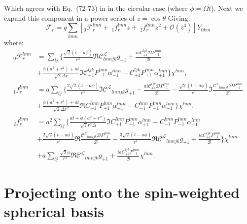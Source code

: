 \documentclass[preprint,showpacs,preprintnumbers,amssymb,superscriptaddress,aps,prd,nofootinbib,11pt]{revtex4-1}
\begin{document}
Which agrees with Eq.~(72-73) in \cite{TorresDolan2022} in the circular case (where $\dot{\phi} = \Omega \dot{t}$). Next we expand this component in a power series of $z=\cos\theta$ Giving:
\begin{equation}
    \mathcal{F}_r = q \sum\limits_{kmn} \left[ {}_0\mathcal{F}_r^{lmn} +\  {}_1f_r^{lmn} z +\  {}_2f_r^{lmn} z^2+ \mathcal{O}(z^3) \right]Y_{0km}
\end{equation}
where:
\begin{align}
   \nonumber {}_0\mathcal{F}_r^{lmn} &= \sum\limits_{lj} \Bigg\{\frac{\sqrt{2} (\dot{t} - a \dot{\phi})}{r^2} \Re{\mathcal{C}^\mathcal{L}_{lmnjk}g_{+1} + \frac{i a \mathcal{C}_{+1}^{ljk} \mathcal{D} P_{-1}^{lmn}}{\mathcal{B}}} \\&+ \frac{\dot{\phi} (a^2 + r^2) + a \dot{t}}{\sqrt{2}\Delta r} \Im{\mathcal{C}_{-1}^{ljk}P_{-1}^{lmn}\alpha_{-1}^{lmn} - \mathcal{C}_{+1}^{ljk} P_{+1}^{lmn} \alpha_{+1}^{lmn}}\Bigg\}\chi^{lmn},\\
   \nonumber {}_1f_r^{lmn} &= a  \sum\limits_{lj} \Bigg\{\frac{2 \sqrt{2} (\dot{t} - a \dot{\phi})}{r^3} \Im{\mathcal{C^L}_{lmnjk} g_{+1} - \frac{ai\mathcal{C}_{+1}^{ljk}\mathcal{D}P_{-1}^{lmn}}{\mathcal{B}}}
   - \frac{\sqrt{2} (\dot{t}-a\dot{\phi})}{r^3} \Im{\frac{\mathcal{C^L}_{lmnjk}\mathcal{D}P_{-1}^{lmn}}{\mathcal{B}}} \\ &+ \frac{\dot{\phi} (a^2 +r^2) + a \dot{t}}{\sqrt{2} \Delta r^2} \Re{C_{+1}^{lmn} P_{+1}^{lmn} \alpha_{+1}^{lmn} - C_{-1}^{lmn} P_{-1}^{lmn} \alpha_{-1}^{lmn}}\Bigg\} \chi^{lmn},\\
   \nonumber {}_2f_r^{lmn} &= a^2 \sum\limits_{lj}\Bigg \{ \frac{a \dot{t} + \dot{\phi} (a^2 + r^2)}{\sqrt{2} r^3 \Delta} \Im{C_{+1}^{lmn} P_{+1}^{lmn} \alpha_{+1}^{lmn} - C_{-1}^{lmn} P_{-1}^{lmn} \alpha_{-1}^{lmn}}\\ 
   \nonumber &+ \frac{2 \sqrt{2} (\dot{t} -a \dot{\phi})}{r^2} \Re{\frac{\mathcal{C^L}_{lmnjk} \mathcal{D}P_{-1}^{lmn}}{\mathcal{B}}} - \frac{3 \sqrt{2} (\dot{t} -a \dot{\phi})}{r^4} \Re{\mathcal{C^L}_{lmnjk} g_{+1} + \frac{i a C_{+1}^{ljk}P_{-1}^{lmn}}{\mathcal{B}}} \Bigg\}\chi^{lmn}\\
   &+ a \sum\limits_{lj} \frac{\sqrt{2} \dot{\phi}}{r^2} \Re{\mathcal{C^L}_{lmnjk} g_{+1} + \frac{i a C_{+1}^{ljk}P_{-1}^{lmn}}{\mathcal{B}}}\chi^{lmn}.
\end{align}
\newpage
\appendix

\section{Projecting onto the spin-weighted spherical basis}
\label{appendix:Projection}
\end{document}
